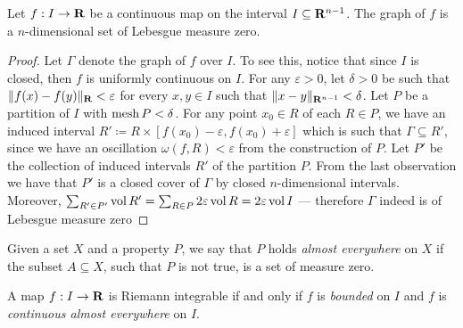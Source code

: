 \begin{example}
\label{exp:graph-lebesgue-measure-zero}
Let \(f: I \to \mathbf{R}\) be a continuous map on the interval \(I \subseteq
\mathbf{R}^{n-1}\). The graph of \(f\) is a \(n\)-dimensional set of Lebesgue measure
zero.

\begin{proof}
Let \(\Gamma\) denote the graph of \(f\) over \(I\). To see this, notice that
since \(I\) is closed, then \(f\) is uniformly continuous on \(I\). For any
\(\varepsilon > 0\), let \(\delta > 0\) be such that \(\lVert f(x) - f(y)\rVert_{\mathbf{R}} <
\varepsilon\) for every \(x, y \in I\) such that \(\lVert x - y\rVert_{\mathbf{R}^{n-1}} <
\delta\). Let \(P\) be a partition of \(I\) with \(\operatorname{mesh} P < \delta\). For any
point \(x_0 \in R\) of each \(R \in P\), we have an induced interval \(R'
\coloneq R \times [f(x_0) - \varepsilon, f(x_0) + \varepsilon]\) which is such
that \(\Gamma \subseteq R'\), since we have an oscillation \(\omega(f, R) <
\varepsilon\) from the construction of \(P\). Let \(P'\) be the collection of
induced intervals \(R'\) of the partition \(P\). From the last observation we
have that \(P'\) is a closed cover of \(\Gamma\) by closed \(n\)-dimensional
intervals. Moreover, \(\sum_{R' \in P'} \operatorname{vol} R' = \sum_{R \in P} 2 \varepsilon
\operatorname{vol} R = 2 \varepsilon \operatorname{vol} I\) --- therefore \(\Gamma\) indeed is of Lebesgue
measure zero
\end{proof}
\end{example}

\begin{notation}
Given a set \(X\) and a property \(P\), we say that \(P\) holds \emph{almost
everywhere} on \(X\) if the subset \(A \subseteq X\), such that \(P\) is not
true, is a set of measure zero.
\end{notation}

\begin{theorem}
\label{thm:lebesgue-criterion-integrable}
A map \(f: I \to \mathbf{R}\) is Riemann integrable if and only if \(f\) is
\emph{bounded} on \(I\) and \(f\) is \emph{continuous almost everywhere} on
\(I\).
\end{theorem}

